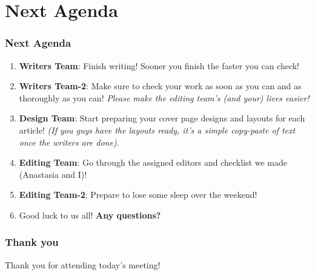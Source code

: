 \documentclass{beamer}
\begin{document}
\section{Next Agenda}
\begin{frame}
    \frametitle{Next Agenda}

    \begin{enumerate}
        \item<1-> \textbf{Writers Team}: Finish writing! Sooner you finish the faster you can check!

        \item<2-> \textbf{Writers Team-2}: Make sure to check your work as soon as you can and as thoroughly as you can! \emph{Please make the editing team's (and your) lives easier!}

        \item<3-> \textbf{Design Team}: Start preparing your cover page designs and layouts for each article! \emph{(If you guys have the layouts ready, it's a simple copy-paste of text once the writers are done)}.

        \item<4-> \textbf{Editing Team}: Go through the assigned editors and checklist we made (Anastasia and I)!

        \item<5-> \textbf{Editing Team-2}: Prepare to lose some sleep over the weekend!

        \item<6-> Good luck to us all! \textbf{Any questions?}
    \end{enumerate}

\end{frame}

\begin{frame}
    \frametitle{Thank you}

    Thank you for attending today's meeting!

\end{frame}
\end{document}

